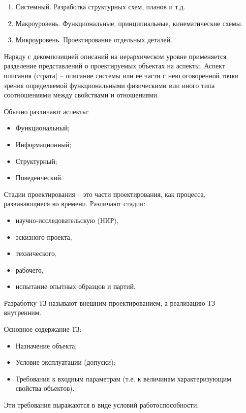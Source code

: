 \documentclass[unicode, 12pt, a4paper, oneside]{article}
\begin{document}
\begin{enumerate}
\item Системный. Разработка структурных схем, планов и т.д.
\item Макроуровень. Функциональные, принципиальные, кинематические схемы.
\item Микроуровень. Проектирование отдельных деталей.
\end{enumerate}

Наряду с декомпозицией описаний на иерархическом уровне применяется разделение представлений о проектируемых объектах на аспекты. Аспект описания (страта) – описание системы или ее части с нею оговоренной точки зрения определяемой функциональными физическими или иного типа соотношениями между свойствами и отношениями.

Обычно различают аспекты: 
\begin{itemize}
\item Функциональный;
\item Информационный;
\item Структурный;
\item Поведенческий.
\end{itemize}

Стадии проектирования – это части проектирования, как процесса, развивающиеся во времени. Различают стадии:
\begin{itemize}
\item научно-исследовательскую (НИР),
\item эскизного проекта,
\item технического,
\item рабочего,
\item испытание опытных образцов и партий.
\end{itemize}

Разработку ТЗ называют внешним проектированием, а реализацию ТЗ – внутренним.

Основное содержание ТЗ:

\begin{itemize}
\item Назначение объекта;
\item Условие эксплуатации (допуски);
\item Требования к входным параметрам (т.е. к величинам характеризующим свойства объектов).
\end{itemize}

Эти требования выражаются в виде условий работоспособности.

\end{document}
